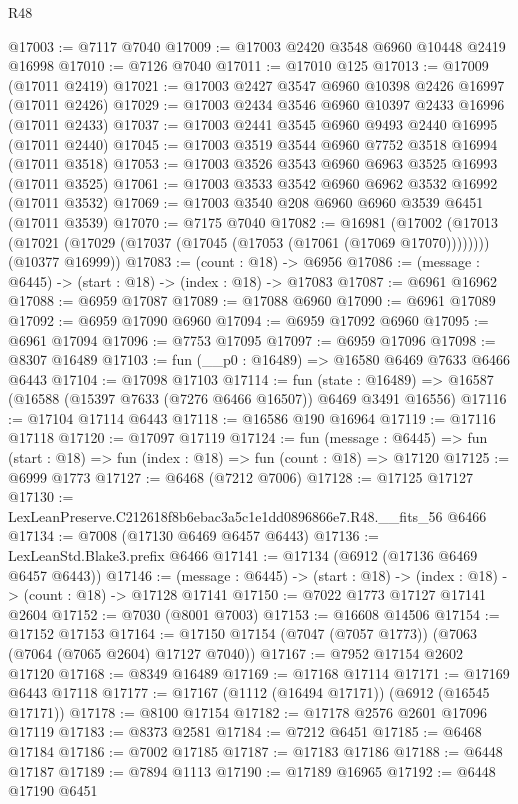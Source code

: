 \begin{lexlean}{R48}
\begin{coremodule}
@17003 := @7117 @7040
@17009 := @17003 @2420 @3548 @6960 @10448 @2419 @16998
@17010 := @7126 @7040
@17011 := @17010 @125
@17013 := @17009 (@17011 @2419)
@17021 := @17003 @2427 @3547 @6960 @10398 @2426 @16997 (@17011 @2426)
@17029 := @17003 @2434 @3546 @6960 @10397 @2433 @16996 (@17011 @2433)
@17037 := @17003 @2441 @3545 @6960 @9493 @2440 @16995 (@17011 @2440)
@17045 := @17003 @3519 @3544 @6960 @7752 @3518 @16994 (@17011 @3518)
@17053 := @17003 @3526 @3543 @6960 @6963 @3525 @16993 (@17011 @3525)
@17061 := @17003 @3533 @3542 @6960 @6962 @3532 @16992 (@17011 @3532)
@17069 := @17003 @3540 @208 @6960 @6960 @3539 @6451 (@17011 @3539)
@17070 := @7175 @7040
@17082 := @16981
    (@17002
      (@17013 (@17021 (@17029 (@17037 (@17045 (@17053 (@17061 (@17069 @17070))))))))
      (@10377 @16999))
@17083 := (count : @18) -> @6956
@17086 := (message : @6445) -> (start : @18) -> (index : @18) -> @17083
@17087 := @6961 @16962
@17088 := @6959 @17087
@17089 := @17088 @6960
@17090 := @6961 @17089
@17092 := @6959 @17090 @6960
@17094 := @6959 @17092 @6960
@17095 := @6961 @17094
@17096 := @7753 @17095
@17097 := @6959 @17096
@17098 := @8307 @16489
@17103 := fun (__p0 : @16489) => @16580 @6469 @7633 @6466 @6443
@17104 := @17098 @17103
@17114 := fun (state : @16489) =>
  @16587 (@16588 (@15397 @7633 (@7276 @6466 @16507)) @6469 @3491 @16556)
@17116 := @17104 @17114 @6443
@17118 := @16586 @190 @16964
@17119 := @17116 @17118
@17120 := @17097 @17119
@17124 := fun (message : @6445) =>
  fun (start : @18) => fun (index : @18) => fun (count : @18) => @17120
@17125 := @6999 @1773
@17127 := @6468 (@7212 @7006)
@17128 := @17125 @17127
@17130 := LexLeanPreserve.C212618f8b6ebac3a5c1e1dd0896866e7.R48.__fits_56 @6466
@17134 := @7008 (@17130 @6469 @6457 @6443)
@17136 := LexLeanStd.Blake3.prefix @6466
@17141 := @17134 (@6912 (@17136 @6469 @6457 @6443))
@17146 := (message : @6445) -> (start : @18) -> (index : @18) -> (count : @18) -> @17128 @17141
@17150 := @7022 @1773 @17127 @17141 @2604
@17152 := @7030 (@8001 @7003)
@17153 := @16608 @14506
@17154 := @17152 @17153
@17164 := @17150 @17154 (@7047 (@7057 @1773)) (@7063 (@7064 (@7065 @2604) @17127 @7040))
@17167 := @7952 @17154 @2602 @17120
@17168 := @8349 @16489
@17169 := @17168 @17114
@17171 := @17169 @6443 @17118
@17177 := @17167 (@1112 (@16494 @17171)) (@6912 (@16545 @17171))
@17178 := @8100 @17154
@17182 := @17178 @2576 @2601 @17096 @17119
@17183 := @8373 @2581
@17184 := @7212 @6451
@17185 := @6468 @17184
@17186 := @7002 @17185
@17187 := @17183 @17186
@17188 := @6448 @17187
@17189 := @7894 @1113
@17190 := @17189 @16965
@17192 := @6448 @17190 @6451

\end{coremodule}
\end{lexlean}
